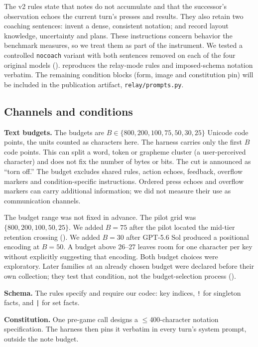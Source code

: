The v2 rules state that notes do not accumulate and that the successor's observation echoes the current turn's presses and results. They also retain two coaching sentences: invent a dense, consistent notation; and record layout knowledge, uncertainty and plans. These instructions concern behavior the benchmark measures, so we treat them as part of the instrument. We tested a controlled \texttt{nocoach} variant with both sentences removed on each of the four original models ().  reproduces the relay-mode rules and imposed-schema notation verbatim. The remaining condition blocks (form, image and constitution pin) will be included in the publication artifact, \texttt{relay/prompts.py}.

\subsection{Channels and conditions}\label{sec:channels}
\textbf{Text budgets.} The budgets are $B \in \{800, 200, 100, 75, 50, 30, 25\}$ Unicode code points, the units counted as characters here. The harness carries only the first $B$ code points. This can split a word, token or grapheme cluster (a user-perceived character) and does not fix the number of bytes or bits. The cut is announced as ``torn off.'' The budget excludes shared rules, action echoes, feedback, overflow markers and condition-specific instructions. Ordered press echoes and overflow markers can carry additional information; we did not measure their use as communication channels.

The budget range was not fixed in advance. The pilot grid was $\{800, 200, 100, 50, 25\}$. We added $B{=}75$ after the pilot located the mid-tier retention crossing (). We added $B{=}30$ after GPT-5.6 Sol produced a positional encoding at $B{=}50$. A budget above 26--27 leaves room for one character per key without explicitly suggesting that encoding. Both budget choices were exploratory. Later families at an already chosen budget were declared before their own collection; they test that condition, not the budget-selection process ().

\textbf{Schema.} The rules specify and require our codec: key indices, \texttt{!} for singleton facts, and \texttt{|} for set facts.

\textbf{Constitution.} One pre-game call designs a $\leq$400-character notation specification. The harness then pins it verbatim in every turn's system prompt, outside the note budget.

